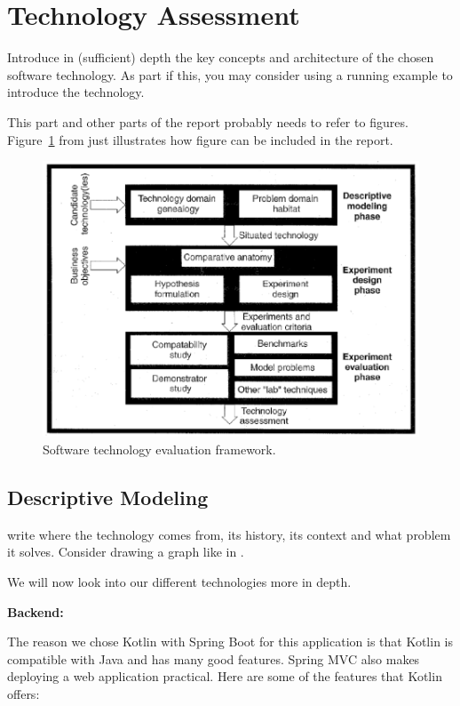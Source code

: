 \section{Technology Assessment}
\label{sec:technology}


Introduce in (sufficient) depth the key concepts and architecture of the chosen software technology. As part if this, you may consider using a running example to introduce the technology.

This part and other parts of the report probably needs to refer to
figures. Figure~\ref{fig:framework} from \cite{brown:96} just
illustrates how figure can be included in the report.

\begin{figure}[thb]
	\centering
	\includegraphics[scale=0.5]{figs/framework.png}
	\caption{Software technology evaluation framework.}
	\label{fig:framework}
\end{figure}

\subsection{Descriptive Modeling}

write where the technology comes from, its history, its context and what problem it solves.
Consider drawing a graph like in \cite{brown:96}.

We will now look into our different technologies more in depth.

\textbf{Backend:}

The reason we chose Kotlin with Spring Boot for this application is that Kotlin is compatible with Java and has many good features. Spring MVC also makes deploying a web application practical. Here are some of the features that Kotlin offers:

